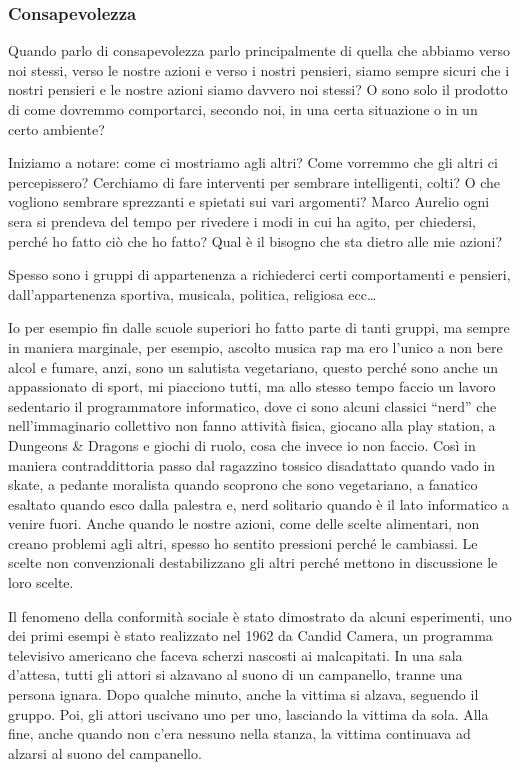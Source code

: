 \documentclass[12pt]{book} %
\begin{document}
\subsubsection{Consapevolezza}
Quando parlo di consapevolezza parlo principalmente di quella che abbiamo verso noi stessi, verso le nostre azioni e
verso i nostri pensieri, siamo sempre sicuri che i nostri pensieri e le nostre azioni siamo davvero noi stessi? O sono
solo il prodotto di come dovremmo comportarci, secondo noi, in una certa situazione o in un certo ambiente? 

Iniziamo a notare: come ci mostriamo agli altri? Come vorremmo che gli altri ci percepissero? Cerchiamo di fare
interventi per sembrare intelligenti, colti? O che vogliono sembrare sprezzanti e spietati sui vari argomenti? Marco
Aurelio ogni sera si prendeva del tempo per rivedere i modi in cui ha agito, per chiedersi, perché ho fatto ciò che ho
fatto? Qual è il bisogno che sta dietro alle mie azioni? 

Spesso sono i gruppi di appartenenza a richiederci certi comportamenti e pensieri,
dall'appartenenza sportiva, musicala, politica, religiosa ecc…


\bigskip

Io per esempio fin dalle scuole superiori ho fatto parte di tanti gruppi, ma sempre in maniera marginale, per esempio,
ascolto musica rap ma ero l'unico a non bere alcol e fumare, anzi, sono un salutista vegetariano,
questo perché sono anche un appassionato di sport, mi piacciono tutti, ma allo stesso tempo faccio un lavoro sedentario
il programmatore informatico, dove ci sono alcuni classici “nerd” che nell'immaginario
collettivo non fanno attività fisica, giocano alla play station, a Dungeons \& Dragons e giochi di ruolo, cosa che invece io non faccio. Così in maniera contraddittoria passo dal ragazzino tossico disadattato quando
vado in skate, a pedante moralista quando scoprono che sono vegetariano, a fanatico esaltato quando esco dalla palestra
e, nerd solitario quando è il lato informatico a venire fuori.
Anche quando le nostre azioni, come delle scelte alimentari, non creano problemi agli altri, spesso ho sentito pressioni perché le cambiassi.
Le scelte non convenzionali destabilizzano gli altri perché mettono in discussione le loro scelte.

\bigskip

Il fenomeno della conformità sociale è stato dimostrato da alcuni esperimenti, uno dei primi esempi è stato realizzato nel 1962 da Candid Camera, un programma televisivo americano che faceva scherzi nascosti ai malcapitati. In una sala d'attesa, tutti gli attori si alzavano al suono di un campanello, tranne una persona ignara. Dopo qualche minuto, anche la vittima si alzava, seguendo il gruppo. Poi, gli attori uscivano uno per uno, lasciando la vittima da sola. Alla fine, anche quando non c'era nessuno nella stanza, la vittima continuava ad alzarsi al suono del campanello.
\end{document}
